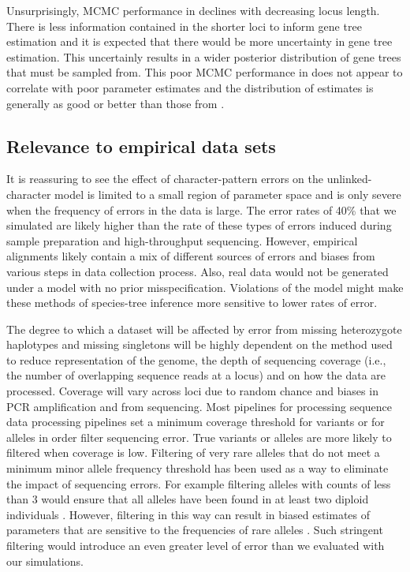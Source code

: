 Unsurprisingly, MCMC performance in \beast declines with decreasing locus length.
There is less information contained in the shorter loci to inform gene tree estimation 
and it is expected that there would be more uncertainty in gene tree estimation.
This uncertainly results in a wider posterior distribution of gene trees that must be 
sampled from. This poor MCMC performance in \beast does not appear to correlate 
with poor parameter estimates and the distribution of estimates is generally as 
good or better than those from \ecoevolity. 


\subsection{Relevance to empirical data sets}
It is reassuring to see the effect of character-pattern errors on the
unlinked-character model is limited to a small region of parameter space and is
only severe when the frequency of errors in the data is large.
The error rates of 40\% that we simulated are likely higher than the rate of
these types of errors induced during sample preparation and high-throughput 
sequencing. However, empirical alignments likely contain a mix of different sources of
errors and biases from various steps in data collection process.
Also, real data would not be generated under a model with no prior misspecification.
Violations of the model might make these methods of species-tree inference more
sensitive to lower rates of error.

The degree to which a dataset will be affected by error from missing
heterozygote haplotypes and missing singletons will be highly dependent on the 
method used to reduce representation of the genome, the depth of sequencing 
coverage (i.e., the number of overlapping sequence reads at
a locus) and on how the data are processed. Coverage will vary across loci due 
to random chance and biases in PCR amplification and from sequencing.
Most pipelines for processing sequence data processing pipelines set 
a minimum coverage threshold for variants or for alleles in order filter
sequencing error. True variants or alleles are more likely to filtered when
coverage is low. 
Filtering of very rare alleles that do not meet a minimum minor allele 
frequency threshold has been used as a way to eliminate the impact of 
sequencing errors. 
For example filtering alleles with counts of less than 3 would ensure that all
alleles have been found in at least two diploid individuals
\citep{rochetteStacksAnalyticalMethods2019}.
However, filtering in this way can result in biased estimates of parameters that
are sensitive to the frequencies of rare alleles
\citep{linckMinorAlleleFrequency2019}. Such stringent filtering would introduce
an even greater level of error than we evaluated with our simulations.


